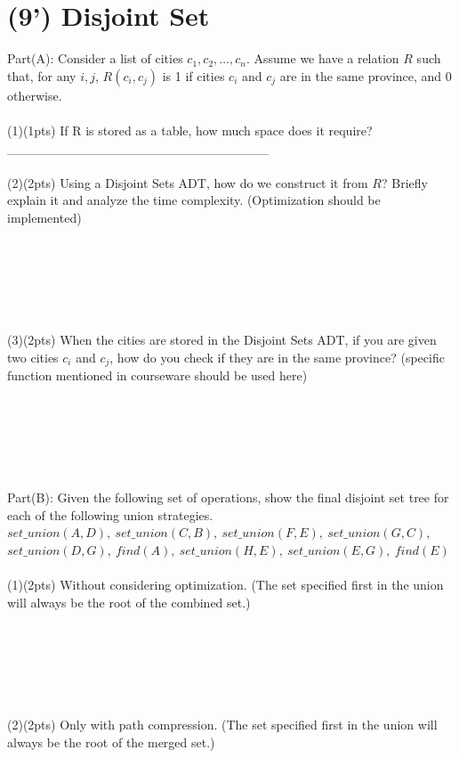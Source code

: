 \documentclass{article}
\begin{document}
\pagebreak

\section{(9') Disjoint Set}
Part(A): Consider a list of cities $c_1, c_2, \dots, c_n$. 
Assume we have a relation $R$ such that, for any $i,j$, $R(c_i,c_j)$ is 1
if cities $c_i$ and $c_j$ are in the same province, and 0 otherwise.\\
\\
(1)(1pts) If R is stored as a table, how much space does it require? \_\_\_\_\_\_\_\_\_\_\_\_\_\_\_\_\_\_\_\_\_\_\_\_\_\_\_\_\\
\\
(2)(2pts) Using a Disjoint Sets ADT, how do we construct it from $R$?
Briefly explain it and analyze the time complexity. (Optimization should be implemented)
\\
\\
\\
\\
\\
\\
\\
(3)(2pts) When the cities are stored in the Disjoint Sets ADT, if you are given two cities $c_i$ and $c_j$, how do you check if they are in the same province? (specific function mentioned in courseware should be used here)\\
\\
\\
\\
\\
\\
\\
Part(B): Given the following set of operations, 
show the final disjoint set tree for each of the following union strategies.\\
$set\_union(A, D),\ set\_union(C, B),\ set\_union(F, E),\ set\_union (G, C),$\\
$set\_union(D,G),\ find(A),\ set\_union(H, E),\ set\_union(E,G),\ find(E)$\\
\\
(1)(2pts) Without considering optimization. (The set specified first in the union will always be the root
of the combined set.)
\\
\\
\\
\\
\\
\\
\\
(2)(2pts) Only with path compression. (The set specified first in the union will always be
the root of the merged set.)\\
\end{document}
